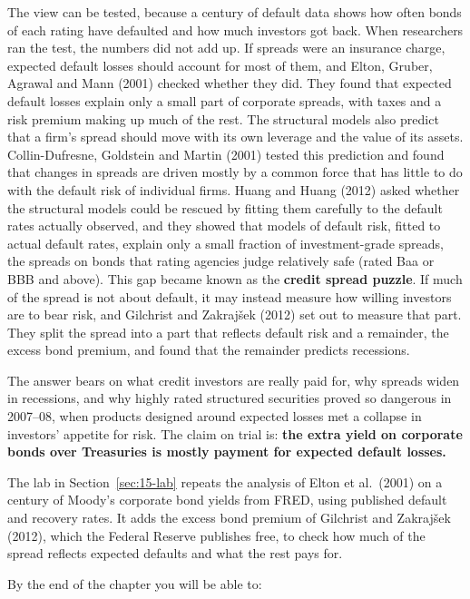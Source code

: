The view can be tested, because a century of default data shows how often bonds of each rating have defaulted and how much investors got back. When researchers ran the test, the numbers did not add up. If spreads were an insurance charge, expected default losses should account for most of them, and Elton, Gruber, Agrawal and Mann (2001) checked whether they did. They found that expected default losses explain only a small part of corporate spreads, with taxes and a risk premium making up much of the rest. The structural models also predict that a firm's spread should move with its own leverage and the value of its assets. Collin-Dufresne, Goldstein and Martin (2001) tested this prediction and found that changes in spreads are driven mostly by a common force that has little to do with the default risk of individual firms. Huang and Huang (2012) asked whether the structural models could be rescued by fitting them carefully to the default rates actually observed, and they showed that models of default risk, fitted to actual default rates, explain only a small fraction of investment-grade spreads, the spreads on bonds that rating agencies judge relatively safe (rated Baa or BBB and above). This gap became known as the \textbf{credit spread puzzle}. If much of the spread is not about default, it may instead measure how willing investors are to bear risk, and Gilchrist and Zakraj\v{s}ek (2012) set out to measure that part. They split the spread into a part that reflects default risk and a remainder, the excess bond premium, and found that the remainder predicts recessions.

The answer bears on what credit investors are really paid for, why spreads widen in recessions, and why highly rated structured securities proved so dangerous in 2007--08, when products designed around expected losses met a collapse in investors' appetite for risk. The claim on trial is: \textbf{the extra yield on corporate bonds over Treasuries is mostly payment for expected default losses.}

The lab in Section~\ref{sec:15-lab} repeats the analysis of Elton et al.\ (2001) on a century of Moody's corporate bond yields from FRED, using published default and recovery rates. It adds the excess bond premium of Gilchrist and Zakraj\v{s}ek (2012), which the Federal Reserve publishes free, to check how much of the spread reflects expected defaults and what the rest pays for.

By the end of the chapter you will be able to:

